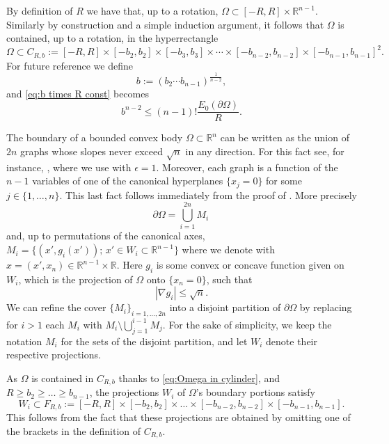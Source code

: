 \documentclass[10pt,leqno]{amsart}
\makeatletter
\newcommand{\R}[0]{\mathbb{R}}
\numberwithin{Theorem}{section}
\theoremstyle{definition}
\theoremstyle{remark}
\numberwithin{equation}{section}
\numberwithin{equation}{section}
\newenvironment{customproof}[1]{%
  \par\pushQED{\qed}%
  \normalfont\topsep6pt \trivlist
  \item[\hskip\labelsep\itshape
    Proof of #1\@addpunct{.}]\ignorespaces
}{%
  \popQED\endtrivlist\@endpefalse
}
\makeatother
\begin{document}
\begin{customproof}{Lemma \ref{lm:bound_on_max_radius_decreasing}}
By definition of $R$ we have that, up to a rotation, $\Omega \subset [-R,R] \times \R^{n-1}$. Similarly by construction and a simple induction argument, it follows that $\Omega$ is contained, up to a rotation, in the hyperrectangle
\begin{equation}
  \label{eq:Omega in cylinder}
\Omega\subset C_{R,b}:=[-R,R] \times [-b_2,b_2] \times  [-b_3,b_3] \times \cdots \times  [-b_{n-2},b_{n-2}] \times [-b_{n-1},b_{n-1}]^2.
\end{equation}
For future reference we define 
\[
b:= \left( b_2 \cdots b_{n-1}  \right)^{\frac{1}{n-2}},
\]
and  \eqref{eq:b times R const} becomes
\begin{equation} \label{eq:b small with R}
    b^{n-2} \leq (n-1)! \frac{E_0(\partial\Omega)}{R}.
\end{equation}

The boundary of a bounded convex body $\Omega\subset\R^n$ can be written as the union of $2n$ graphs whose slopes never exceed $\sqrt{n}$ in any direction. For this fact see, for instance, \cite[Lemma 2.1 and 2.2]{Csato2024},  where we use \cite[Lemma 2.2]{Csato2024} with $\epsilon=1$. Moreover, each graph is a function of the $n-1$ variables of one of the canonical hyperplanes $\{x_j=0\}$ for some $j\in\{1,\ldots,n\}.$ This last fact follows immediately from the proof of \cite[Lemma 2.2]{Csato2024}.
More precisely
$$
  \partial\Omega=\bigcup_{i=1}^{2n} M_i\,
$$
and, up to permutations of the canonical axes, $M_i=\{(x',g_i(x'));\, x'\in W_i\subset \R^{n-1}\}$ where we denote with $x=(x',x_n) \in \R^{n-1} \times \R$. Here $g_i$ is some convex or concave function given on $W_i$, which is the projection of $\Omega$ onto $\{x_n=0\}$, such that
\begin{equation}
 \label{eq:nabla g bounded}
 |\nabla g_i|\leq \sqrt{n}.
\end{equation}
We can refine the cover $\{M_i\}_{i=1,\dots,2n}$ into a disjoint partition of $\partial\Omega$ by replacing for $i>1$ each $M_i$ with $M_i \setminus \bigcup_{j=1}^{i-1} M_j$. For the sake of simplicity, we keep the notation $M_i$ for the sets of the disjoint partition, and let $W_i$ denote their respective projections.


As $\Omega$ is contained in $C_{R,b}$ thanks to \eqref{eq:Omega in cylinder}, and $R\geq b_2\geq\ldots\geq b_{n-1}$, the projections $W_i$ of $\Omega$'s boundary  portions satisfy 
\begin{equation}
 \label{eq:new FRb}
  W_i\subset F_{R,b}:=[-R,R]\times[-b_2,b_2] \times \dots \times[-b_{n-2},b_{n-2}]\times [-b_{n-1},b_{n-1}].
\end{equation}
This follows from the fact that these projections are obtained by omitting one of the brackets in the definition of $C_{R,b}$. 






\end{customproof}
\end{document}
